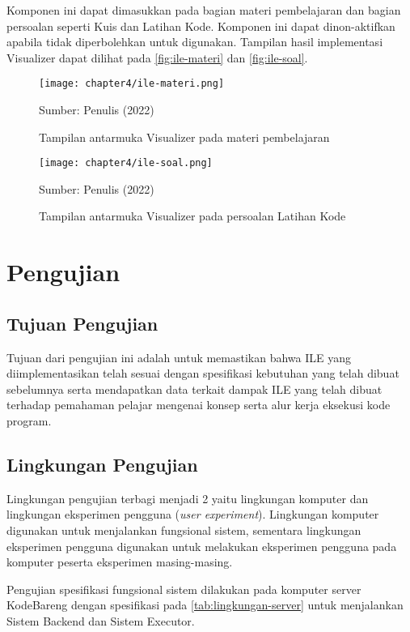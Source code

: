 Komponen ini dapat dimasukkan pada bagian materi pembelajaran dan bagian persoalan seperti Kuis dan Latihan Kode. Komponen ini dapat dinon-aktifkan apabila tidak diperbolehkan untuk digunakan. Tampilan hasil implementasi Visualizer dapat dilihat pada \autoref{fig:ile-materi} dan \autoref{fig:ile-soal}.

\begin{figure}[H]
  \centering
  \texttt{[image: chapter4/ile-materi.png]}
  \caption{Tampilan antarmuka Visualizer pada materi pembelajaran} \label{fig:ile-materi}
  Sumber: Penulis (2022)
\end{figure}
\begin{figure}[H]
  \centering
  \texttt{[image: chapter4/ile-soal.png]}
  \caption{Tampilan antarmuka Visualizer pada persoalan Latihan Kode} \label{fig:ile-soal}
  Sumber: Penulis (2022)
\end{figure}

\section{Pengujian}

\subsection{Tujuan Pengujian}
Tujuan dari pengujian ini adalah untuk memastikan bahwa ILE yang diimplementasikan telah sesuai dengan spesifikasi kebutuhan yang telah dibuat sebelumnya serta mendapatkan data terkait dampak ILE yang telah dibuat terhadap pemahaman pelajar mengenai konsep serta alur kerja eksekusi kode program.

\subsection{Lingkungan Pengujian}
Lingkungan pengujian terbagi menjadi 2 yaitu lingkungan komputer dan lingkungan eksperimen pengguna (\textit{user experiment}). Lingkungan komputer digunakan untuk menjalankan fungsional sistem, sementara lingkungan eksperimen pengguna digunakan untuk melakukan eksperimen pengguna pada komputer peserta eksperimen masing-masing.

Pengujian spesifikasi fungsional sistem dilakukan pada komputer server KodeBareng dengan spesifikasi pada \autoref{tab:lingkungan-server} untuk menjalankan Sistem Backend dan Sistem Executor.

